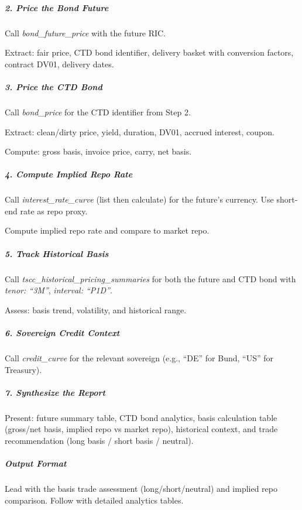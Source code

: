 \documentclass[11pt]{article}
\begin{document}
\subparagraph{2. Price the Bond Future}\mbox{}\par

Call \emph{bond\_\allowbreak{}future\_\allowbreak{}price} with the future RIC.


Extract: fair price, CTD bond identifier, delivery basket with conversion factors, contract DV01, delivery dates.


\subparagraph{3. Price the CTD Bond}\mbox{}\par

Call \emph{bond\_\allowbreak{}price} for the CTD identifier from Step 2.


Extract: clean/dirty price, yield, duration, DV01, accrued interest, coupon.


Compute: gross basis, invoice price, carry, net basis.


\subparagraph{4. Compute Implied Repo Rate}\mbox{}\par

Call \emph{interest\_\allowbreak{}rate\_\allowbreak{}curve} (list then calculate) for the future's currency. Use short-end rate as repo proxy.


Compute implied repo rate and compare to market repo.


\subparagraph{5. Track Historical Basis}\mbox{}\par

Call \emph{tscc\_\allowbreak{}historical\_\allowbreak{}pricing\_\allowbreak{}summaries} for both the future and CTD bond with \emph{tenor: ``3M''}, \emph{interval: ``P1D''}.


Assess: basis trend, volatility, and historical range.


\subparagraph{6. Sovereign Credit Context}\mbox{}\par

Call \emph{credit\_\allowbreak{}curve} for the relevant sovereign (e.g., ``DE'' for Bund, ``US'' for Treasury).


\subparagraph{7. Synthesize the Report}\mbox{}\par

Present: future summary table, CTD bond analytics, basis calculation table (gross/net basis, implied repo vs market repo), historical context, and trade recommendation (long basis / short basis / neutral).


\subparagraph{Output Format}\mbox{}\par

Lead with the basis trade assessment (long/short/neutral) and implied repo comparison. Follow with detailed analytics tables.
\end{document}
